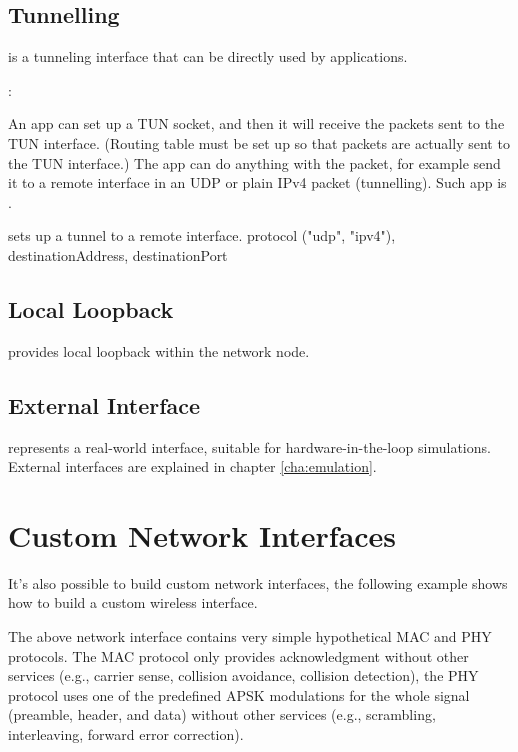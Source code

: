  
\subsection{Tunnelling}

 is a tunneling interface that can be directly 
used by applications.

: 

An app can set up a TUN socket, and then it will receive the packets
sent to the TUN interface. (Routing table must be set up so that packets
are actually sent to the TUN interface.) The app can do anything with the
packet, for example send it to a remote interface in an UDP or plain IPv4
packet (tunnelling). Such app is .

 sets up a tunnel to a remote interface.
protocol ("udp", "ipv4"), destinationAddress, destinationPort


\subsection{Local Loopback}

 provides local loopback within the network node.

\subsection{External Interface}

 represents a real-world interface, suitable for 
hardware-in-the-loop simulations. External interfaces are explained in 
chapter \ref{cha:emulation}.

\section{Custom Network Interfaces}

It's also possible to build custom network interfaces, the following
example shows how to build a custom wireless interface.


The above network interface contains very simple hypothetical MAC and PHY
protocols. The MAC protocol only provides acknowledgment without other
services (e.g., carrier sense, collision avoidance, collision detection),
the PHY protocol uses one of the predefined APSK modulations for the whole
signal (preamble, header, and data) without other services (e.g.,
scrambling, interleaving, forward error correction).





